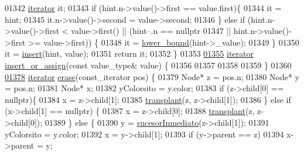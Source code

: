 \begin{DoxyCode}
01342         \hyperlink{classaed2_1_1iterator}{iterator} it;
01343         \textcolor{keywordflow}{if} (hint.n->value()->first == value.first)\{
01344             it = hint;
01345             it.n->value()->second = value->second;
01346             \} \textcolor{keywordflow}{else} \textcolor{keywordflow}{if} (hint.n->value()->first < value->first() || (hint--.n == \textcolor{keyword}{
      nullptr}
01347             || hint.n->value()->first >= value->first)) \{
01348             it = \hyperlink{classaed2_1_1map_a3399d36fdd5a880b494f3a5795d3f18f_a3399d36fdd5a880b494f3a5795d3f18f}{lower_bound}(hint->\_value);
01349         \}
01350         it = \hyperlink{classaed2_1_1map_a60aacba06b1579630b3c8e996cf248c8_a60aacba06b1579630b3c8e996cf248c8}{insert}(hint, value);
01351         \textcolor{keywordflow}{return} it;
01352     \}
01353 
\hypertarget{map2_8h_source_l01355}{}\hyperlink{classaed2_1_1map_a9128a806713bcc999ebd8a97ab77e765_a9128a806713bcc999ebd8a97ab77e765}{01355}     \hyperlink{classaed2_1_1iterator}{iterator} \hyperlink{classaed2_1_1map_a9128a806713bcc999ebd8a97ab77e765_a9128a806713bcc999ebd8a97ab77e765}{insert_or_assign}(\textcolor{keyword}{const} value\_type& value) \{
01356 
01357 
01358         
01359     \}
01360 
\hypertarget{map2_8h_source_l01378}{}\hyperlink{classaed2_1_1map_ad8e796bf9c9c558e5ce6b61e116253fe_ad8e796bf9c9c558e5ce6b61e116253fe}{01378}     \hyperlink{classaed2_1_1iterator}{iterator} \hyperlink{classaed2_1_1map_ad8e796bf9c9c558e5ce6b61e116253fe_ad8e796bf9c9c558e5ce6b61e116253fe}{erase}(const\_iterator pos) \{
01379         Node* z = pos.n;
01380         Node* y = pos.n;
01381         Node* x;
01382         yColorsito = y.color;
01383         \textcolor{keywordflow}{if} (z->child[0] == \textcolor{keyword}{nullptr})\{
01384             x = z->child[1];
01385             \hyperlink{classaed2_1_1map_a98b9f200c64ce02dfb67902ee00e375a_a98b9f200c64ce02dfb67902ee00e375a}{transplant}(z, z->child[1]);
01386         \} \textcolor{keywordflow}{else} \textcolor{keywordflow}{if} (x->child[1] == \textcolor{keyword}{nullptr}) \{
01387             x = z->child[0];
01388             \hyperlink{classaed2_1_1map_a98b9f200c64ce02dfb67902ee00e375a_a98b9f200c64ce02dfb67902ee00e375a}{transplant}(z, z->child[0]);
01389         \} \textcolor{keywordflow}{else} \{
01390             y = \hyperlink{classaed2_1_1map_a51169c7d557dc5cf26eac59e6e5e6d98_a51169c7d557dc5cf26eac59e6e5e6d98}{sucesorInmediato}(z->child[1]);
01391             yColorsito = y.color;
01392             x = y->child[1];
01393             \textcolor{keywordflow}{if} (y->parent == z)
01394                 x->parent = y;

\end{DoxyCode}
